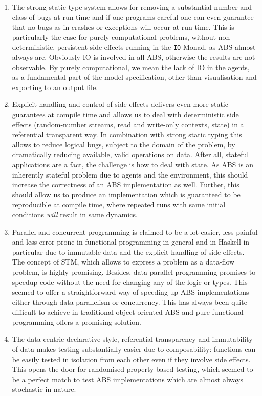 \begin{enumerate}
	\item The strong static type system allows for removing a substantial number and class of bugs at run time and if one programs careful one can even guarantee that no bugs as in crashes or exceptions will occur at run time. This is particularly the case for purely computational problems, without non-deterministic, persistent side effects running in the \texttt{IO} Monad, as ABS almost always are. Obviously IO is involved in all ABS, otherwise the results are not observable. By purely computational, we mean the lack of IO in the agents, as a fundamental part of the model specification, other than visualisation and exporting to an output file.
	
	\item Explicit handling and control of side effects delivers even more static guarantees at compile time and allows us to deal with deterministic side effects (random-number streams, read and write-only contexts, state) in a referential transparent way. In combination with strong static typing this allows to reduce logical bugs, subject to the domain of the problem, by dramatically reducing available, valid operations on data. After all, stateful applications are a fact, the challenge is how to deal with state. As ABS is an inherently stateful problem due to agents and the environment, this should increase the correctness of an ABS implementation as well. Further, this should allow us to produce an implementation which is guaranteed to be reproducible at compile time, where repeated runs with same initial conditions \textit{will} result in same dynamics.
	
	\item Parallel and concurrent programming is claimed to be a lot easier, less painful and less error prone in functional programming in general and in Haskell in particular due to immutable data and the explicit handling of side effects. The concept of STM, which allows to express a problem as a data-flow problem, is highly promising. Besides, data-parallel programming promises to speedup code without the need for changing any of the logic or types. This seemed to offer a straightforward way of speeding up ABS implementations either through data parallelism or concurrency. This has always been quite difficult to achieve in traditional object-oriented ABS and pure functional programming offers a promising solution.
	
	\item The data-centric declarative style, referential transparency and immutability of data makes testing substantially easier due to composability: functions can be easily tested in isolation from each other even if they involve side effects. This opens the door for randomised property-based testing, which seemed to be a perfect match to test ABS implementations which are almost always stochastic in nature.
\end{enumerate}

